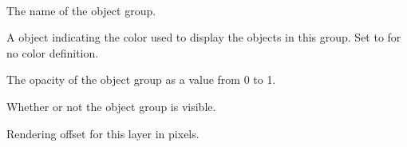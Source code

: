\documentclass[letterpaper,10pt,english]{sphinxmanual}
\begin{document}
\begin{fulllineitems}
\label{index:tmx.ObjectGroup}~

\begin{fulllineitems}
\label{index:tmx.ObjectGroup.name}
The name of the object group.

\end{fulllineitems}


\begin{fulllineitems}
\label{index:tmx.ObjectGroup.color}
A {\hyperref[index:tmx.Color]{\emph{}}} object indicating the color used to display the
objects in this group.  Set to  for no color
definition.

\end{fulllineitems}


\begin{fulllineitems}
\label{index:tmx.ObjectGroup.opacity}
The opacity of the object group as a value from 0 to 1.

\end{fulllineitems}


\begin{fulllineitems}
\label{index:tmx.ObjectGroup.visible}
Whether or not the object group is visible.

\end{fulllineitems}


\begin{fulllineitems}
\label{index:tmx.ObjectGroup.offsetx}
Rendering offset for this layer in pixels.

\end{fulllineitems}



\end{fulllineitems}
\end{document}
